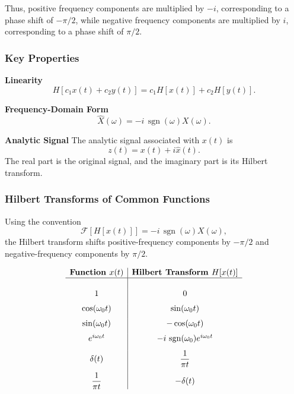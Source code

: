 Thus, positive frequency components are multiplied by $-i$, corresponding to a phase shift of $-\pi/2$, while negative frequency components are multiplied by $i$, corresponding to a phase shift of $\pi/2$.

\subsubsection*{Key Properties}

\begin{conceptbox}
    \textbf{Linearity}
    \[
        H[c_1x(t)+c_2y(t)]
        =
        c_1H[x(t)]+c_2H[y(t)].
    \]
\end{conceptbox}

\begin{conceptbox}
    \textbf{Frequency-Domain Form}
    \[
        \widehat{X}(\omega)
        =
        -i\,\operatorname{sgn}(\omega)X(\omega).
    \]
\end{conceptbox}

\begin{conceptbox}
    \textbf{Analytic Signal}
    The analytic signal associated with $x(t)$ is
    \[
        z(t)=x(t)+i\hat{x}(t).
    \]
    The real part is the original signal, and the imaginary part is its Hilbert transform.
\end{conceptbox}

\subsubsection*{Hilbert Transforms of Common Functions}

\begin{conceptbox}
    Using the convention
    \[
        \mathcal{F}[H[x(t)]]
        =
        -i\,\operatorname{sgn}(\omega)X(\omega),
    \]
    the Hilbert transform shifts positive-frequency components by $-\pi/2$ and negative-frequency components by $\pi/2$.

    \[
        \begin{array}{c|c}
            \textbf{Function } x(t) & \textbf{Hilbert Transform } H[x(t)]            \\ \hline \\[1pt]
            1                       & 0                                              \\[6pt]
            \cos(\omega_0t)         & \sin(\omega_0t)                                \\[6pt]
            \sin(\omega_0t)         & -\cos(\omega_0t)                               \\[6pt]
            e^{i\omega_0t}          & -i\,\operatorname{sgn}(\omega_0)e^{i\omega_0t} \\[8pt]
            \delta(t)               & \dfrac{1}{\pi t}                               \\[10pt]
            \dfrac{1}{\pi t}        & -\delta(t)
        \end{array}
    \]
\end{conceptbox}

